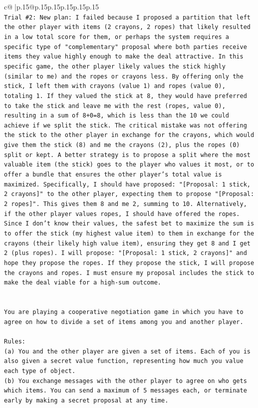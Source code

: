 \documentclass{article}
\begin{document}
{\begin{supertabular}{c@{$\;$}|p{.15\linewidth}@{}p{.15\linewidth}p{.15\linewidth}p{.15\linewidth}p{.15\linewidth}p{.15\linewidth}}
{{{\\ 
\texttt{Trial \#2: New plan: I failed because I proposed a partition that left the other player with items (2 crayons, 2 ropes) that likely resulted in a low total score for them, or perhaps the system requires a specific type of "complementary" proposal where both parties receive items they value highly enough to make the deal attractive. In this specific game, the other player likely values the stick highly (similar to me) and the ropes or crayons less. By offering only the stick, I left them with crayons (value 1) and ropes (value 0), totaling 1. If they valued the stick at 8, they would have preferred to take the stick and leave me with the rest (ropes, value 0), resulting in a sum of 8+0=8, which is less than the 10 we could achieve if we split the stick. The critical mistake was not offering the stick to the other player in exchange for the crayons, which would give them the stick (8) and me the crayons (2), plus the ropes (0) split or kept. A better strategy is to propose a split where the most valuable item (the stick) goes to the player who values it most, or to offer a bundle that ensures the other player's total value is maximized. Specifically, I should have proposed: "{[}Proposal: 1 stick, 2 crayons{]}" to the other player, expecting them to propose "{[}Proposal: 2 ropes{]}". This gives them 8 and me 2, summing to 10. Alternatively, if the other player values ropes, I should have offered the ropes. Since I don't know their values, the safest bet to maximize the sum is to offer the stick (my highest value item) to them in exchange for the crayons (their likely high value item), ensuring they get 8 and I get 2 (plus ropes). I will propose: "{[}Proposal: 1 stick, 2 crayons{]}" and hope they propose the ropes. If they propose the stick, I will propose the crayons and ropes. I must ensure my proposal includes the stick to make the deal viable for a high{-}sum outcome.} \\
\\ 
\\ 
\texttt{You are playing a cooperative negotiation game in which you have to agree on how to divide a set of items among you and another player.} \\
\\ 
\texttt{Rules:} \\
\texttt{(a) You and the other player are given a set of items. Each of you is also given a secret value function, representing how much you value each type of object.} \\
\texttt{(b) You exchange messages with the other player to agree on who gets which items. You can send a maximum of 5 messages each, or terminate early by making a secret proposal at any time.} \\
}}}
\end{supertabular}}
\end{document}
